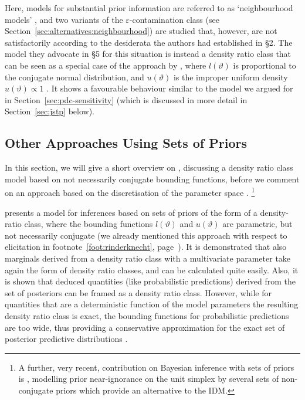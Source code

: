 Here, models for substantial prior information are referred to as `neighbourhood models' \parencite[\S 4]{1991:pericchi},
and two variants of the $\varepsilon$-contamination class (see Section~\ref{sec:alternatives:neighbourhood}) are studied
that, however, are not satisfactorily according to the desiderata the authors had established in \S 2.
The model they advocate in \S 5 for this situation %
is instead a density ratio class that
can be seen as a special case of the approach by \textcite[see below]{2011:rinderknecht:diss},
where $l(\vartheta)$ is proportional to the conjugate normal distribution,
and $u(\vartheta)$ is the improper uniform density $u(\vartheta) \propto 1$ \parencite[\S 4.3]{1991:pericchi}.
It shows a favourable behaviour similar to the model we argued for in Section~\ref{sec:pdc-sensitivity}
(which is discussed in more detail in Section~\ref{sec:jstp} below).


\subsection{Other Approaches Using Sets of Priors}
\label{sec:alternatives:other}

In this section, we will give a short overview on \textcite[\S 4]{2011:rinderknecht:diss},
discussing a density ratio class model based on not necessarily conjugate bounding functions,
before we comment on an approach based on the discretisation of the parameter space
\parencite{2005:whitcomb}.%
\footnote{A further, very recent, contribution on Bayesian inference with sets of priors
is \textcite{2013:mangilibenavoli}, modelling prior near-ignorance on the unit simplex
by several sets of non-conjugate priors which provide an alternative to the IDM.}

\medskip

\textcite[\S 4]{2011:rinderknecht:diss} presents a model for inferences 
based on sets of priors of the form of a density-ratio class,
where the bounding functions $l(\vartheta)$ and $u(\vartheta)$ are parametric, but not necessarily conjugate
(we already mentioned this approach with respect to elicitation in footnote~\ref{foot:rinderknecht}, page~\pageref{foot:rinderknecht}).
It is demonstrated that also marginals derived from a density ratio class with a multivariate parameter
take again the form of density ratio classes, and can be calculated quite easily.
Also, it is shown that deduced quantities (like probabilistic predictions) derived from the set of posteriors
can be framed as a density ratio class.
However, while for quantities that are a deterministic function of the model parameters
the resulting density ratio class is exact, the bounding functions %
for probabilistic predictions are too wide, thus providing a conservative approximation for
the exact set of posterior predictive distributions \parencite[\S 4.2.4]{2011:rinderknecht:diss}.

